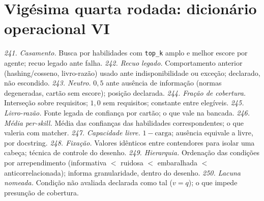\section{Vigésima quarta rodada: dicionário operacional VI}
\textit{241. Casamento.} Busca por habilidades com \texttt{top\_k} amplo e melhor escore por agente; recuo legado ante falha.
\textit{242. Recuo legado.} Comportamento anterior (hashing/cosseno, livro-razão) usado ante indisponibilidade ou exceção; declarado, não escondido.
\textit{243. Neutro.} $0{,}5$ ante ausência de informação (normas degeneradas, cartão sem escore); posição declarada.
\textit{244. Fração de cobertura.} Interseção sobre requisitos; $1{,}0$ sem requisitos; constante entre elegíveis.
\textit{245. Livro-razão.} Fonte legada de confiança por cartão; o que vale na bancada.
\textit{246. Média per-skill.} Média das confianças das habilidades correspondentes; o que valeria com matcher.
\textit{247. Capacidade livre.} $1-\mathrm{carga}$; ausência equivale a livre, por docstring.
\textit{248. Fixação.} Valores idênticos entre contendores para isolar uma cabeça; técnica de controle do desenho.
\textit{249. Hierarquia.} Ordenação das condições por arrependimento (informativa $<$ ruidosa $<$ embaralhada $<$ anticorrelacionada); informa granularidade, dentro do desenho.
\textit{250. Lacuna nomeada.} Condição não avaliada declarada como tal ($v=q$); o que impede presunção de cobertura.
